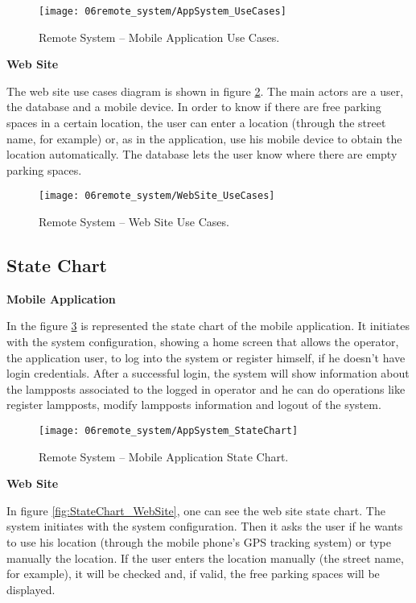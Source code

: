 \begin{figure}[H]
        \centering
        \texttt{[image: 06remote\_system/AppSystem\_UseCases]}
        \caption{Remote System – Mobile Application Use Cases.}
        \label{fig:UseCases_application}
\end{figure}

\textbf{Web Site}

The web site use cases diagram is shown in figure \ref{fig:UseCases_WebSite}. The main actors are a user, the database and a mobile device. In order to know if there are free parking spaces in a certain location, the user can enter a location (through the street name, for example) or, as in the application, use his mobile device to obtain the location automatically. The database lets the user know where there are empty parking spaces.

\begin{figure}[H]
        \centering
        \texttt{[image: 06remote\_system/WebSite\_UseCases]}
        \caption{Remote System – Web Site Use Cases.}
        \label{fig:UseCases_WebSite}
\end{figure}

\subsection{State Chart}
\textbf{Mobile Application}

In the figure \ref{fig:StateChart_application} is represented the state chart of the mobile application. It initiates with the system configuration, showing a home screen that allows the operator, the application user, to log into the system or register himself, if he doesn’t have login credentials. After a successful login, the system will show information about the lampposts associated to the logged in operator and he can do operations like register lampposts, modify lampposts information and logout of the system.

\begin{figure}[H]
        \centering
        \texttt{[image: 06remote\_system/AppSystem\_StateChart]}
        \caption{Remote System – Mobile Application State Chart.}
        \label{fig:StateChart_application}
\end{figure}

\textbf{Web Site}

In figure \ref{fig:StateChart_WebSite}, one can see the web site state chart. The system initiates with the system configuration. Then it asks the user if he wants to use his location (through the mobile phone's GPS tracking system) or type manually the location. If the user enters the location manually (the street name, for example), it will be checked and, if valid, the free parking spaces will be displayed.

